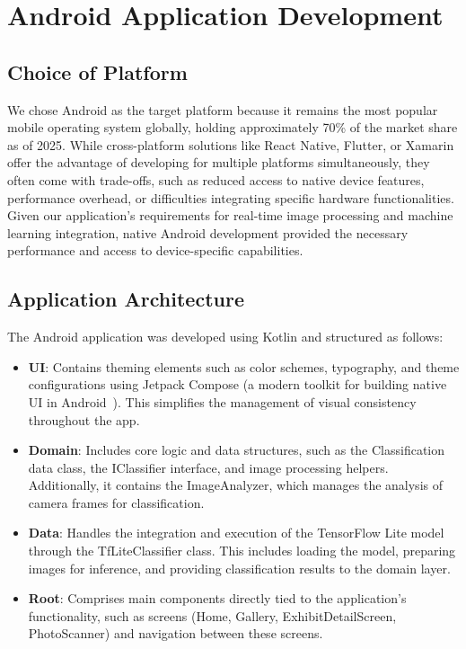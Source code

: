 \chapter{Android Application Development}

\section{Choice of Platform}

We chose Android as the target platform because it remains the most popular mobile operating system globally, holding approximately 70\% of the market share as of 2025. While cross-platform solutions like React Native, Flutter, or Xamarin offer the advantage of developing for multiple platforms simultaneously, they often come with trade-offs, such as reduced access to native device features, performance overhead, or difficulties integrating specific hardware functionalities. Given our application's requirements for real-time image processing and machine learning integration, native Android development provided the necessary performance and access to device-specific capabilities.

\section{Application Architecture}

The Android application was developed using Kotlin and structured as follows:

\begin{itemize}
\item \textbf{UI}: Contains theming elements such as color schemes, typography, and theme configurations using Jetpack Compose (a modern toolkit for building native UI in Android~\cite{jetpack_compose}). This simplifies the management of visual consistency throughout the app.
\item \textbf{Domain}: Includes core logic and data structures, such as the Classification data class, the IClassifier interface, and image processing helpers. Additionally, it contains the ImageAnalyzer, which manages the analysis of camera frames for classification.
\item \textbf{Data}: Handles the integration and execution of the TensorFlow Lite model through the TfLiteClassifier class. This includes loading the model, preparing images for inference, and providing classification results to the domain layer.
\item \textbf{Root}: Comprises main components directly tied to the application's functionality, such as screens (Home, Gallery, ExhibitDetailScreen, PhotoScanner) and navigation between these screens.
\end{itemize}


